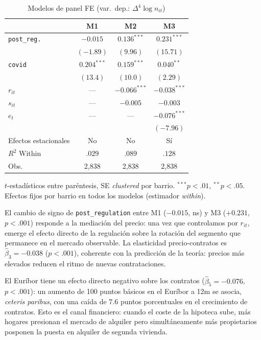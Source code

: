 \documentclass[10pt,a4paper,twocolumn]{article}
\begin{document}
\begin{table}[H]
\caption{Modelos de panel FE (var.\ dep.: $\Delta^4\!\log n_{it}$)}
\label{tab:panel}
\centering\small
\begin{threeparttable}
\begin{tabular}{lccc}
\toprule
 & M1 & M2 & M3 \\
\midrule
\texttt{post\_reg.}  & $-0.015$ & $0.136^{***}$ & $0.231^{***}$ \\
                     & $(-1.89)$ & $(9.96)$ & $(15.71)$ \\
\texttt{covid}       & $0.204^{***}$ & $0.159^{***}$ & $0.040^{**}$ \\
                     & $(13.4)$ & $(10.0)$ & $(2.29)$ \\
$r_{it}$            & --- & $-0.066^{***}$ & $-0.038^{***}$ \\
$s_{it}$            & --- & $-0.005$ & $-0.003$ \\
$e_t$               & --- & --- & $-0.076^{***}$ \\
                     & & & $(-7.96)$ \\
Efectos estacionales & No & No & Sí \\
\midrule
$R^2$ Within & $.029$ & $.089$ & $.128$ \\
Obs.         & 2,838 & 2,838 & 2,838 \\
\bottomrule
\end{tabular}
\begin{tablenotes}\small
\item $t$-estadísticos entre paréntesis, SE \textit{clustered} por barrio.
$^{***}p{<}.01$, $^{**}p{<}.05$.
Efectos fijos por barrio en todos los modelos (estimador \textit{within}).
\end{tablenotes}
\end{threeparttable}
\end{table}

El cambio de signo de \texttt{post\_regulation} entre M1 ($-0.015$, ns) y M3
($+0.231$, $p{<}.001$) responde a la mediación del precio: una vez que controlamos
por $r_{it}$, emerge el efecto directo de la regulación sobre la rotación del
segmento que permanece en el mercado observable. La elasticidad precio-contratos
es $\hat{\beta}_3 {=} -0.038$ ($p{<}.001$), coherente con la predicción de la teoría:
precios más elevados reducen el ritmo de nuevas contrataciones.

El Euríbor tiene un efecto directo negativo sobre los contratos ($\hat{\beta}_5{=}-0.076$,
$p{<}.001$): un aumento de 100 puntos básicos en el Euríbor a 12m se asocia, \textit{ceteris
paribus}, con una caída de $7.6$ puntos porcentuales en el crecimiento de contratos. Esto
es el canal financiero: cuando el coste de la hipoteca sube, más hogares presionan el
mercado de alquiler pero simultáneamente más propietarios posponen la puesta en alquiler
de segunda vivienda.
\end{document}
